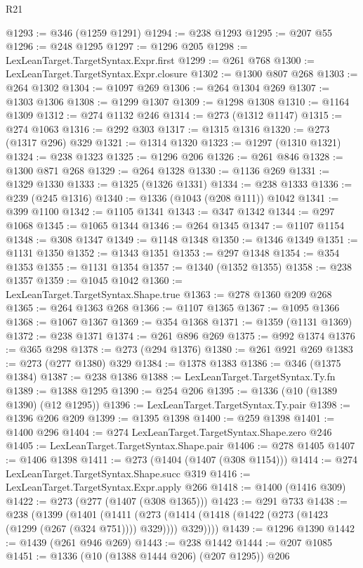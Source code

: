 \begin{lexlean}{R21}
\begin{coremodule}
{{{{{{{{{{{{{{{{{{{@1293 := @346 (@1259 @1291)
@1294 := @238 @1293
@1295 := @207 @55
@1296 := @248 @1295
@1297 := @1296 @205
@1298 := LexLeanTarget.TargetSyntax.Expr.first
@1299 := @261 @768
@1300 := LexLeanTarget.TargetSyntax.Expr.closure
@1302 := @1300 @807 @268
@1303 := @264 @1302
@1304 := @1097 @269
@1306 := @264 @1304 @269
@1307 := @1303 @1306
@1308 := @1299 @1307
@1309 := @1298 @1308
@1310 := @1164 @1309
@1312 := @274 @1132 @246
@1314 := @273 (@1312 @1147)
@1315 := @274 @1063
@1316 := @292 @303
@1317 := @1315 @1316
@1320 := @273 (@1317 @296) @329
@1321 := @1314 @1320
@1323 := @1297 (@1310 @1321)
@1324 := @238 @1323
@1325 := @1296 @206
@1326 := @261 @846
@1328 := @1300 @871 @268
@1329 := @264 @1328
@1330 := @1136 @269
@1331 := @1329 @1330
@1333 := @1325 (@1326 @1331)
@1334 := @238 @1333
@1336 := @239 (@245 @1316)
@1340 := @1336 (@1043 (@208 @111)) @1042
@1341 := @399 @1100
@1342 := @1105 @1341
@1343 := @347 @1342
@1344 := @297 @1068
@1345 := @1065 @1344
@1346 := @264 @1345
@1347 := @1107 @1154
@1348 := @308 @1347
@1349 := @1148 @1348
@1350 := @1346 @1349
@1351 := @1131 @1350
@1352 := @1343 @1351
@1353 := @297 @1348
@1354 := @354 @1353
@1355 := @1131 @1354
@1357 := @1340 (@1352 @1355)
@1358 := @238 @1357
@1359 := @1045 @1042
@1360 := LexLeanTarget.TargetSyntax.Shape.true
@1363 := @278 @1360 @209 @268
@1365 := @264 @1363 @268
@1366 := @1107 @1365
@1367 := @1095 @1366
@1368 := @1067 @1367
@1369 := @354 @1368
@1371 := @1359 (@1131 @1369)
@1372 := @238 @1371
@1374 := @261 @896 @269
@1375 := @992 @1374
@1376 := @365 @298
@1378 := @273 (@294 @1376)
@1380 := @261 @921 @269
@1383 := @273 (@277 @1380) @329
@1384 := @1378 @1383
@1386 := @346 (@1375 @1384)
@1387 := @238 @1386
@1388 := LexLeanTarget.TargetSyntax.Ty.fn
@1389 := @1388 @1295
@1390 := @254 @206
@1395 := @1336 (@10 (@1389 @1390) (@12 @1295))
@1396 := LexLeanTarget.TargetSyntax.Ty.pair
@1398 := @1396 @206 @209
@1399 := @1395 @1398
@1400 := @259 @1398
@1401 := @1400 @296
@1404 := @274 LexLeanTarget.TargetSyntax.Shape.zero @246
@1405 := LexLeanTarget.TargetSyntax.Shape.pair
@1406 := @278 @1405
@1407 := @1406 @1398
@1411 := @273 (@1404 (@1407 (@308 @1154)))
@1414 := @274 LexLeanTarget.TargetSyntax.Shape.succ @319
@1416 := LexLeanTarget.TargetSyntax.Expr.apply @266
@1418 := @1400 (@1416 @309)
@1422 := @273 (@277 (@1407 (@308 @1365)))
@1423 := @291 @733
@1438 := @238
    (@1399
      (@1401
        (@1411 (@273 (@1414 (@1418 (@1422 (@273 (@1423 (@1299 (@267 (@324 @751)))) @329)))) @329))))
@1439 := @1296 @1390
@1442 := @1439 (@261 @946 @269)
@1443 := @238 @1442
@1444 := @207 @1085
@1451 := @1336 (@10 (@1388 @1444 @206) (@207 @1295)) @206
}}}}}}}}}}}}}}}}}}}
\end{coremodule}
\end{lexlean}

